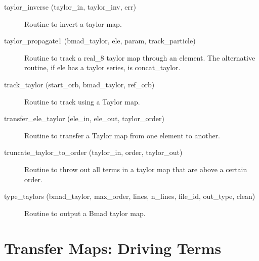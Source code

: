 \begin{description}
\label{r:taylor.inverse}
\item[taylor_inverse (taylor_in, taylor_inv, err)] \Newline
Routine to invert a taylor map. 

\label{r:taylor.propagate1}
\item[taylor_propagate1 (bmad_taylor, ele, param, track_particle)] \Newline
Routine to track a real_8 taylor map through an element. 
The alternative routine, if ele has a taylor series, is concat_taylor. 

\label{r:track.taylor}
\item[track_taylor (start_orb, bmad_taylor, ref_orb)] \Newline
Routine to track using a Taylor map. 

\label{r:transfer.ele.taylor}
\item[transfer_ele_taylor (ele_in, ele_out, taylor_order)] \Newline 
Routine to transfer a Taylor map from one element to another.

\label{r:truncate.taylor.to.order}
\item[truncate_taylor_to_order (taylor_in, order, taylor_out)] \Newline 
Routine to throw out all terms in a taylor map that are above a certain order.

\label{r:type.taylors}
\item[type_taylors (bmad_taylor, max_order, lines, n_lines, file_id, out_type, clean)] \Newline
Routine to output a Bmad taylor map.

\end{description}


\section{Transfer Maps: Driving Terms}
\label{r:driving.terms}   

